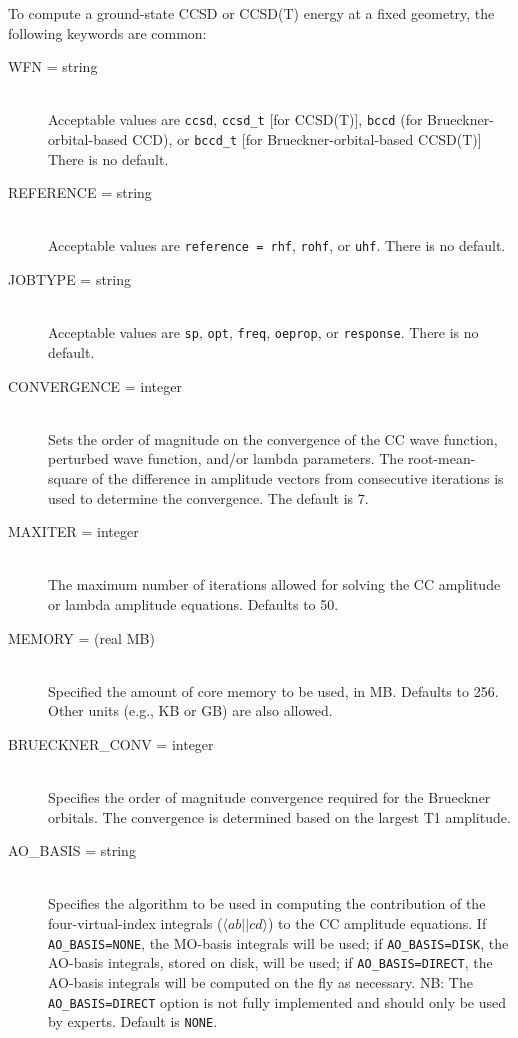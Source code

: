 To compute a ground-state CCSD or CCSD(T) energy at a fixed geometry,
the following keywords are common:
\begin{description}
\item[WFN = string]\mbox{}\\
Acceptable values are {\tt ccsd}, {\tt ccsd\_t} [for CCSD(T)], {\tt bccd} 
(for Brueckner-orbital-based CCD), or {\tt bccd\_t} [for 
Brueckner-orbital-based CCSD(T)] There is no default.
\item[REFERENCE = string]\mbox{}\\
Acceptable values are {\tt reference = rhf}, {\tt rohf}, or {\tt uhf}.
There is no default.
\item[JOBTYPE = string]\mbox{}\\
Acceptable values are {\tt sp}, {\tt opt}, {\tt freq}, {\tt oeprop}, or 
{\tt response}.  There is no default. 
\item[CONVERGENCE = integer]\mbox{}\\
Sets the order of magnitude on the convergence of the CC wave function,
perturbed wave function, and/or lambda parameters.  The root-mean-square of
the difference in amplitude vectors from consecutive iterations is used to
determine the convergence.  The default is 7.
\item[MAXITER = integer]\mbox{}\\
The maximum number of iterations allowed for solving the CC amplitude or
lambda amplitude equations.  Defaults to 50.
\item[MEMORY = (real MB)]\mbox{}\\
Specified the amount of core memory to be used, in MB.  Defaults to 256.
Other units (e.g., KB or GB) are also allowed.
\item[BRUECKNER\_CONV = integer]\mbox{}\\
Specifies the order of magnitude convergence required for the Brueckner
orbitals.  The convergence is determined based on the largest T1
amplitude.
\item[AO\_BASIS = string]\mbox{}\\
Specifies the algorithm to be used in computing the contribution of the
four-virtual-index integrals ($\langle ab||cd\rangle$) to the CC amplitude
equations.  If {\tt AO\_BASIS=NONE}, the MO-basis integrals will be used;
if {\tt AO\_BASIS=DISK}, the AO-basis integrals, stored on disk, will be
used; if {\tt AO\_BASIS=DIRECT}, the AO-basis integrals will be computed on
the fly as necessary.  NB: The {\tt AO\_BASIS=DIRECT} option is not fully
implemented and should only be used by experts.  Default is {\tt NONE}.

\end{description}

